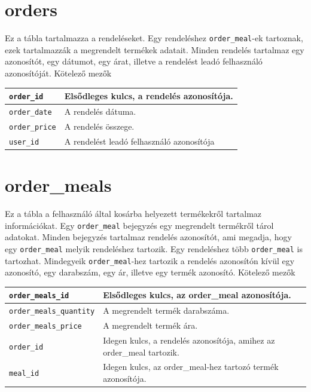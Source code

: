 \section{orders}

Ez a tábla tartalmazza a rendeléseket. Egy rendeléshez \texttt{order\_meal}-ek tartoznak, ezek tartalmazzák a megrendelt termékek adatait. Minden rendelés tartalmaz egy azonosítót, egy dátumot, egy árat, illetve a rendelést leadó felhasználó azonosítóját.
Kötelező mezők

\begin{tabular}{|p{3cm}|p{10cm}|}
\hline
\texttt{order\_id} & Elsődleges kulcs, a rendelés azonosítója. \\
\hline
\texttt{order\_date} & A rendelés dátuma. \\
\hline
\texttt{order\_price} & A rendelés összege. \\
\hline
\texttt{user\_id} & A rendelést leadó felhasználó azonosítója \\
\hline
\end{tabular}

\section{order\_meals}

Ez a tábla a felhasználó által kosárba helyezett termékekről tartalmaz információkat. Egy \texttt{order\_meal} bejegyzés egy megrendelt termékről tárol adatokat. Minden bejegyzés tartalmaz rendelés azonosítót, ami megadja, hogy egy \texttt{order\_meal} melyik rendeléshez tartozik. Egy rendeléshez több \texttt{order\_meal} is tartozhat. Mindegyeik \texttt{order\_meal}-hez tartozik a rendelés azonosítón kívül egy azonosító, egy darabszám, egy ár, illetve egy termék azonosító.
Kötelező mezők

\begin{tabular}{|p{3cm}|p{10cm}|}
    \texttt{order\_meals\_id} & Elsődleges kulcs, az order\_meal azonosítója. \\
    \hline
    \texttt{order\_meals\_quantity} & A megrendelt termék darabszáma. \\
    \hline
    \texttt{order\_meals\_price} & A megrendelt termék ára. \\
    \hline
    \texttt{order\_id} & Idegen kulcs, a rendelés azonosítója, amihez az order\_meal tartozik. \\
    \hline
    \texttt{meal\_id} & Idegen kulcs, az order\_meal-hez tartozó termék azonosítója. \\
    \hline
\end{tabular}

